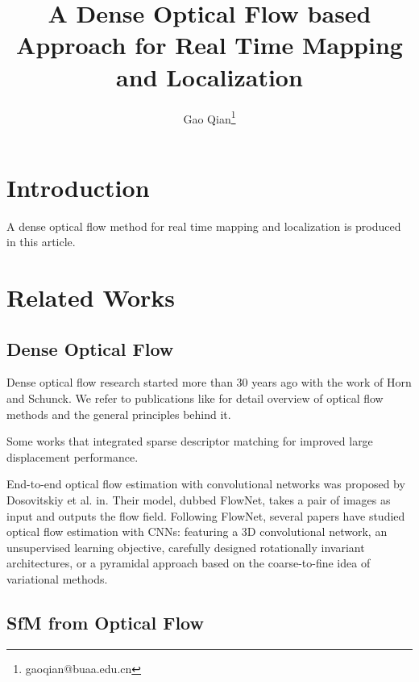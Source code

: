 \documentclass{article}
\title { A Dense Optical Flow based Approach for Real Time Mapping and Localization }
\author{   }
\author{Gao Qian\thanks{gaoqian@buaa.edu.cn}}
\affil{Department of Computer Science, BUAA University}
\begin{document}
\maketitle

\begin{abstract}
\end{abstract}

\section{Introduction}
A dense optical flow method for real time mapping and localization is produced in this article.

\section{Related Works}
\subsection{Dense Optical Flow}
Dense optical flow research started more than 30 years ago with the work of Horn and Schunck\cite{Horn1981Determining}. We refer to publications like \cite{Baker2007A}\cite{Sun2010Secrets}\cite{Vogel2013An} for detail overview of optical flow methods and the general principles behind it.\par

Some works that integrated sparse descriptor matching for improved large displacement performance\cite{Brox2011Large}\cite{Xu2012Motion}\cite{Weinzaepfel2014DeepFlow}\cite{Kennedy2015Optical}\cite{Timofte2015Sparse}.\par

End-to-end optical flow estimation with convolutional networks was proposed by Dosovitskiy et al. in\cite{Dosovitskiy2015FlowNet}. Their model, dubbed FlowNet, takes a pair of images as input and outputs the flow field. Following FlowNet, several papers have studied optical flow estimation with CNNs: featuring a 3D convolutional network\cite{Du2015Deep}, an unsupervised learning objective\cite{Ahmadi2016Unsupervised}\cite{Yu2016Back}, carefully designed rotationally invariant architectures\cite{Teney2016Learning}, or a pyramidal approach based on the coarse-to-fine idea of variational methods\cite{Ranjan2017Optical}.\par


\subsection{SfM from Optical Flow}
\end{document}
